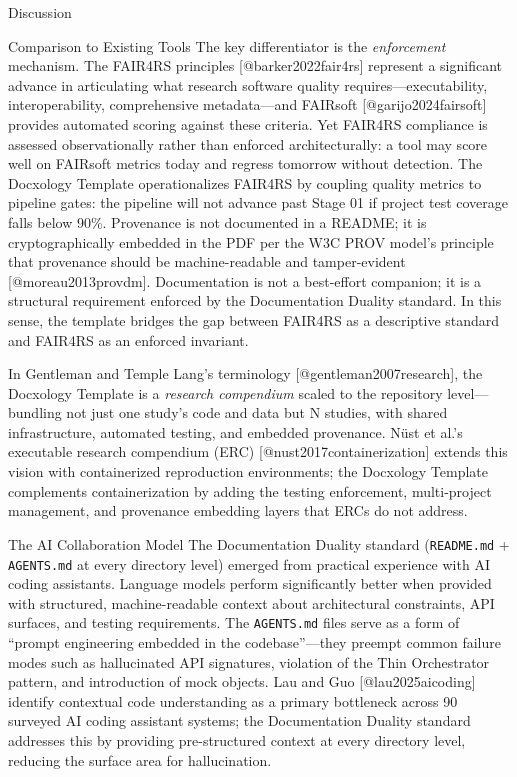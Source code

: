 \documentclass[
  ignorenonframetext,
]{beamer}
\begin{document}
\begin{frame}[fragile]{Discussion}
\begin{block}{Comparison to Existing Tools}
The key differentiator is the \emph{enforcement} mechanism. The FAIR4RS
principles {[}@barker2022fair4rs{]} represent a significant advance in
articulating what research software quality requires---executability,
interoperability, comprehensive metadata---and FAIRsoft
{[}@garijo2024fairsoft{]} provides automated scoring against these
criteria. Yet FAIR4RS compliance is assessed observationally rather than
enforced architecturally: a tool may score well on FAIRsoft metrics
today and regress tomorrow without detection. The Docxology Template
operationalizes FAIR4RS by coupling quality metrics to pipeline gates:
the pipeline will not advance past Stage 01 if project test coverage
falls below 90\%. Provenance is not documented in a README; it is
cryptographically embedded in the PDF per the W3C PROV model's principle
that provenance should be machine-readable and tamper-evident
{[}@moreau2013provdm{]}. Documentation is not a best-effort companion;
it is a structural requirement enforced by the Documentation Duality
standard. In this sense, the template bridges the gap between FAIR4RS as
a descriptive standard and FAIR4RS as an enforced invariant.

In Gentleman and Temple Lang's terminology {[}@gentleman2007research{]},
the Docxology Template is a \emph{research compendium} scaled to the
repository level---bundling not just one study's code and data but N
studies, with shared infrastructure, automated testing, and embedded
provenance. Nüst et al.'s executable research compendium (ERC)
{[}@nust2017containerization{]} extends this vision with containerized
reproduction environments; the Docxology Template complements
containerization by adding the testing enforcement, multi-project
management, and provenance embedding layers that ERCs do not address.
\end{block}

\begin{block}{The AI Collaboration Model}
\protect{}\label{the-ai-collaboration-model}
The Documentation Duality standard (\texttt{README.md} +
\texttt{AGENTS.md} at every directory level) emerged from practical
experience with AI coding assistants. Language models perform
significantly better when provided with structured, machine-readable
context about architectural constraints, API surfaces, and testing
requirements. The \texttt{AGENTS.md} files serve as a form of ``prompt
engineering embedded in the codebase''---they preempt common failure
modes such as hallucinated API signatures, violation of the Thin
Orchestrator pattern, and introduction of mock objects. Lau and Guo
{[}@lau2025aicoding{]} identify contextual code understanding as a
primary bottleneck across 90 surveyed AI coding assistant systems; the
Documentation Duality standard addresses this by providing
pre-structured context at every directory level, reducing the surface
area for hallucination.


\end{block}
\end{frame}
\end{document}
